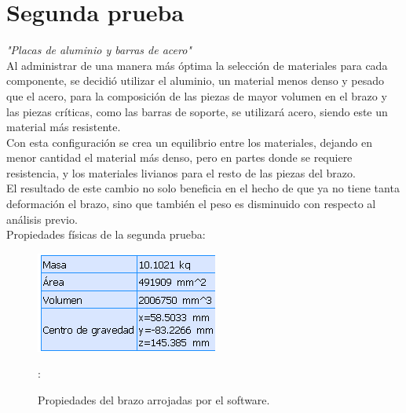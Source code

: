 \documentclass[11pt,a4paper,oldfontcommands,oneside]{memoir}
\begin{document}
\chapter{Segunda prueba}
\begin{flushleft}

\textit{"Placas de aluminio y barras de acero"}\\
Al administrar de una manera más óptima la selección de materiales para cada componente, se decidió utilizar el aluminio, un material menos denso y pesado que el acero, para la composición de las piezas de mayor volumen en el brazo y las piezas críticas, como las barras de soporte, se utilizará acero, siendo este un material más resistente. \\

Con esta configuración se crea un equilibrio entre los materiales, dejando en menor cantidad el material más denso, pero en partes donde se requiere resistencia, y los materiales livianos para el resto de las piezas del brazo.\\
El resultado de este cambio no solo beneficia en el hecho de que ya no tiene tanta deformación el brazo, sino que también el peso es disminuido con respecto al análisis previo.\\

Propiedades físicas de la segunda prueba:

\begin{figure}
\begin{center}
\includegraphics[scale=.95]{prop2.png}
\end{center}
\caption{Propiedades del brazo arrojadas por el software.}
\label{tabla4}:
\end{figure}


\end{flushleft}
\end{document}
